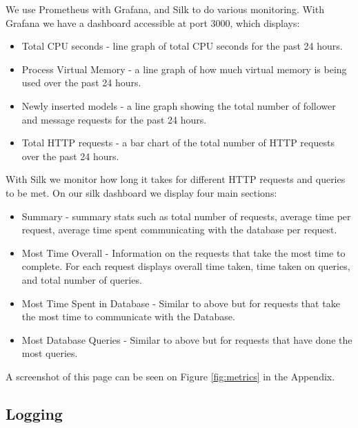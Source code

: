 We use Prometheus with Grafana, and Silk to do various monitoring. With Grafana we have a dashboard accessible at port 3000, which displays:
\begin{itemize}
    \item Total CPU seconds - line graph of total CPU seconds for the past 24 hours.
    
    \item Process Virtual Memory - a line graph of how much virtual memory is being used over the past 24 hours.
    
    \item Newly inserted models - a line graph showing the total number of follower and message requests for the past 24 hours.
    
    \item Total HTTP requests - a bar chart of the total number of HTTP requests over the past 24 hours.
\end{itemize}

With Silk we monitor how long it takes for different HTTP requests and queries to be met. On our silk dashboard we display four main sections:

\begin{itemize}
    \item Summary - summary stats such as total number of requests, average time per request, average time spent communicating with the database per request.
    
    \item Most Time Overall - Information on the requests that take the most time to complete. For each request displays overall time taken, time taken on queries, and total number of queries.

    \item Most Time Spent in Database - Similar to above but for requests that take the most time to communicate with the Database.

    \item Most Database Queries - Similar to above but for requests that have done the most queries.
\end{itemize}

A screenshot of this page can be seen on Figure \ref{fig:metrics} in the Appendix.

\subsection{Logging}

